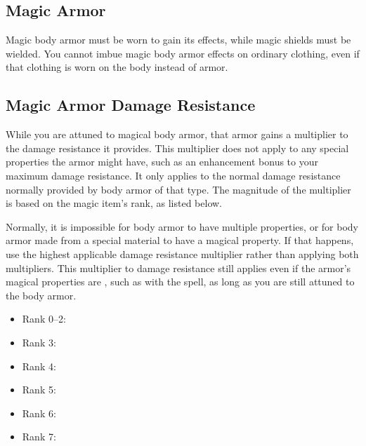       \begin{longcolumn}
        \section{Magic Armor}\label{Magic Armor}
          \begin{longtablepreface}
            Magic body armor must be worn to gain its effects, while magic shields must be wielded.
            You cannot imbue magic body armor effects on ordinary clothing, even if that clothing is worn on the body instead of armor.

            \subsection{Magic Armor Damage Resistance}\label{Magic Armor Damage Resistance}
              While you are attuned to magical body armor, that armor gains a multiplier to the damage resistance it provides.
              This multiplier does not apply to any special properties the armor might have, such as an enhancement bonus to your maximum damage resistance.
              It only applies to the normal damage resistance normally provided by body armor of that type.
              The magnitude of the multiplier is based on the magic item's rank, as listed below.

              Normally, it is impossible for body armor to have multiple properties, or for body armor made from a special material to have a magical property.
              If that happens, use the highest applicable damage resistance multiplier rather than applying both multipliers.
              This multiplier to damage resistance still applies even if the armor's magical properties are , such as with the  spell, as long as you are still attuned to the body armor.

              \begin{itemize}
                \item Rank 0--2: 
                \item Rank 3: 
                \item Rank 4: 
                \item Rank 5: 
                \item Rank 6: 
                \item Rank 7: 
              \end{itemize}
          \end{longtablepreface}

          

      \end{longcolumn}

